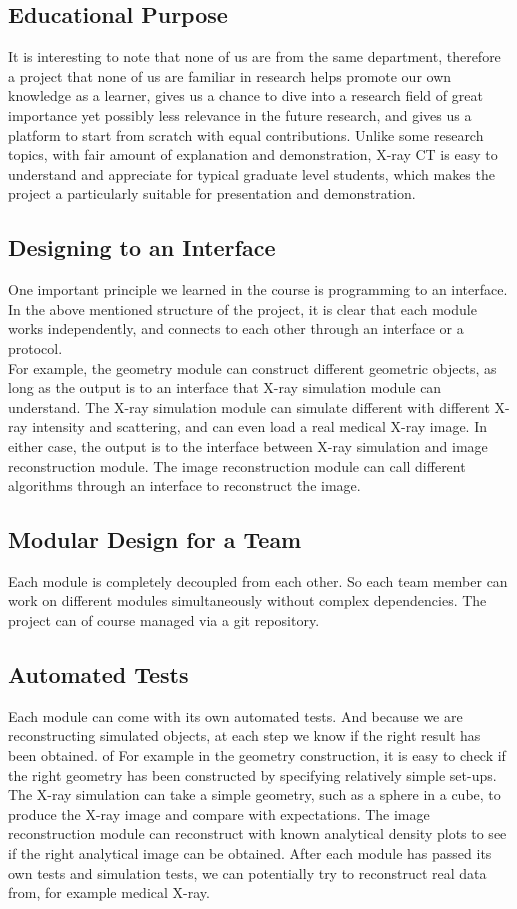 \documentclass[11]{article}
\begin{document}
\subsection{Educational Purpose}
	It is interesting to note that none of us are from the same department, therefore a project that none of us are familiar in research helps promote our own knowledge as a learner, gives us a chance to dive into a research field of great importance yet possibly less relevance in the future research, and gives us a platform to start from scratch with equal contributions. Unlike some research topics, with fair amount of explanation and demonstration, X-ray CT is easy to understand and appreciate for typical graduate level students, which makes the project a particularly suitable for presentation and demonstration.
	
\subsection{Designing to an Interface}
	One important principle we learned in the course is programming to an interface. In the above mentioned structure of the project, it is clear that each module works independently, and connects to each other through an interface or a protocol.\\ For example, the geometry module can construct different geometric objects, as long as the output is to an interface that X-ray simulation module can understand. 	The X-ray simulation module can simulate different with different X-ray intensity and scattering, and can even load a real medical X-ray image. In either case, the output is to the interface between X-ray simulation and image reconstruction module. The image reconstruction module can call different algorithms through an interface to reconstruct the image.

\subsection{Modular Design for a Team}
	Each module is completely decoupled from each other. So each team member can work on different modules simultaneously without complex dependencies. The project can of course managed via a git repository. 

\subsection{Automated Tests}
	Each module can come with its own automated tests. And because we are reconstructing simulated objects, at each step we know if the right result has been obtained. of For example in the geometry construction, it is easy to check if the right geometry has been constructed by specifying relatively simple set-ups. The X-ray simulation can take a simple geometry, such as a sphere in a cube, to produce the X-ray image and compare with expectations. The image reconstruction module can reconstruct with known analytical density plots to see if the right analytical image can be obtained. After each module has passed its own tests and simulation tests, we can potentially try to reconstruct real data from, for example medical X-ray.
\end{document}
